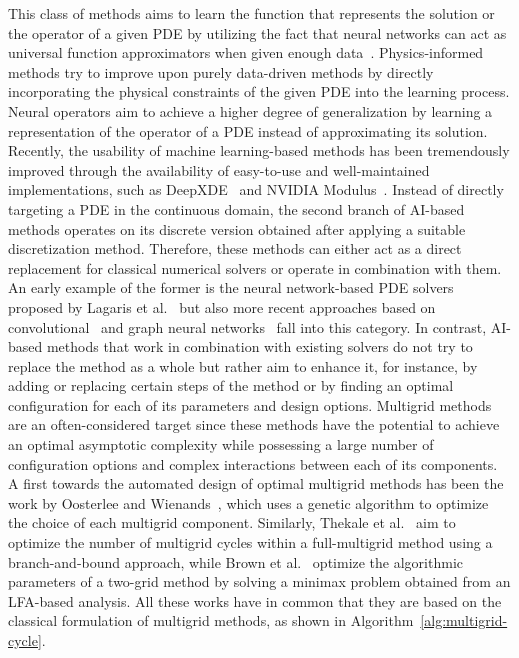 This class of methods aims to learn the function that represents the solution or the operator of a given PDE by utilizing the fact that neural networks can act as universal function approximators when given enough data~\cite{hornik1989multilayer}.
Physics-informed methods try to improve upon purely data-driven methods by directly incorporating the physical constraints of the given PDE into the learning process.
Neural operators aim to achieve a higher degree of generalization by learning a representation of the operator of a PDE instead of approximating its solution.
Recently, the usability of machine learning-based methods has been tremendously improved through the availability of easy-to-use and well-maintained implementations, such as DeepXDE~\cite{lu2021deepxde} and NVIDIA Modulus~\cite{hennigh2021nvidia}. 
Instead of directly targeting a PDE in the continuous domain, the second branch of AI-based methods operates on its discrete version obtained after applying a suitable discretization method.
Therefore, these methods can either act as a direct replacement for classical numerical solvers or operate in combination with them.
An early example of the former is the neural network-based PDE solvers proposed by Lagaris et al.~\cite{lagaris1998artificial} but also more recent approaches based on convolutional~\cite{thuerey2020deep} and graph neural networks~\cite{pfaff2020learning} fall into this category.
In contrast, AI-based methods that work in combination with existing solvers do not try to replace the method as a whole but rather aim to enhance it, for instance, by adding or replacing certain steps of the method or by finding an optimal configuration for each of its parameters and design options.
Multigrid methods are an often-considered target since these methods have the potential to achieve an optimal asymptotic complexity while possessing a large number of configuration options and complex interactions between each of its components.
A first towards the automated design of optimal multigrid methods has been the work by Oosterlee and Wienands~\cite{oosterlee2003genetic}, which uses a genetic algorithm to optimize the choice of each multigrid component.
Similarly, Thekale et al.~\cite{thekale2010optimizing} aim to optimize the number of multigrid cycles within a full-multigrid method using a branch-and-bound approach, while Brown et al.~\cite{brown2021tuning} optimize the algorithmic parameters of a two-grid method by solving a minimax problem obtained from an LFA-based analysis.
All these works have in common that they are based on the classical formulation of multigrid methods, as shown in Algorithm~\ref{alg:multigrid-cycle}.
